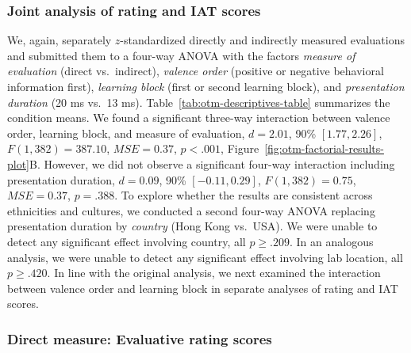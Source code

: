 \documentclass[
  man,floatsintext]{apa6}
\begin{document}
\hypertarget{joint-analysis-of-rating-and-iat-scores-1}{%
\subsubsection{Joint analysis of rating and IAT scores}\label{joint-analysis-of-rating-and-iat-scores-1}}

We, again, separately \(z\)-standardized directly and indirectly measured evaluations and submitted them to a four-way ANOVA with the factors \emph{measure of evaluation} (direct vs.~indirect), \emph{valence order} (positive or negative behavioral information first), \emph{learning block} (first or second learning block), and \emph{presentation duration} (20 ms vs.~13 ms).
Table~\ref{tab:otm-descriptives-table} summarizes the condition means.
We found a significant three-way interaction between valence order, learning block, and measure of evaluation, \(d = 2.01\), 90\% \([1.77, 2.26]\), \(F(1, 382) = 387.10\), \(\mathit{MSE} = 0.37\), \(p < .001\), Figure~\ref{fig:otm-factorial-results-plot}B.
However, we did not observe a significant four-way interaction including presentation duration, \(d = 0.09\), 90\% \([-0.11, 0.29]\), \(F(1, 382) = 0.75\), \(\mathit{MSE} = 0.37\), \(p = .388\).
To explore whether the results are consistent across ethnicities and cultures, we conducted a second four-way ANOVA replacing presentation duration by \emph{country} (Hong Kong vs.~USA).
We were unable to detect any significant effect involving country, all \(p \geq .209\).
In an analogous analysis, we were unable to detect any significant effect involving lab location, all \(p \geq .420\).
In line with the original analysis, we next examined the interaction between valence order and learning block in separate analyses of rating and IAT scores.

\hypertarget{direct-measure-evaluative-rating-scores-1}{%
\subsubsection{Direct measure: Evaluative rating scores}\label{direct-measure-evaluative-rating-scores-1}}
\end{document}
